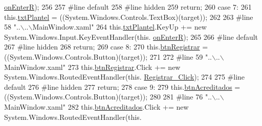 \begin{DoxyCode}
      \hyperlink{class_asistencias__wpf_1_1_main_window_a021f286d29f89afb7e646c8a02fdcb4b}{onEnterR});
256             
257 \textcolor{preprocessor}{            #line default}
258 \textcolor{preprocessor}{}\textcolor{preprocessor}{            #line hidden}
259 \textcolor{preprocessor}{}            \textcolor{keywordflow}{return};
260             \textcolor{keywordflow}{case} 7:
261             this.\hyperlink{class_asistencias__wpf_1_1_main_window_a20520a2029311127a68cc320e5a1aed4}{txtPlantel} = ((System.Windows.Controls.TextBox)(target));
262             
263 \textcolor{preprocessor}{            #line 58 "..\(\backslash\)..\(\backslash\)MainWindow.xaml"}
264 \textcolor{preprocessor}{}            this.\hyperlink{class_asistencias__wpf_1_1_main_window_a20520a2029311127a68cc320e5a1aed4}{txtPlantel}.KeyUp += \textcolor{keyword}{new} System.Windows.Input.KeyEventHandler(this.
      \hyperlink{class_asistencias__wpf_1_1_main_window_a021f286d29f89afb7e646c8a02fdcb4b}{onEnterR});
265             
266 \textcolor{preprocessor}{            #line default}
267 \textcolor{preprocessor}{}\textcolor{preprocessor}{            #line hidden}
268 \textcolor{preprocessor}{}            \textcolor{keywordflow}{return};
269             \textcolor{keywordflow}{case} 8:
270             this.\hyperlink{class_asistencias__wpf_1_1_main_window_a37ce519d4dc242993a180c9ec48581f6}{btnRegistrar} = ((System.Windows.Controls.Button)(target));
271             
272 \textcolor{preprocessor}{            #line 59 "..\(\backslash\)..\(\backslash\)MainWindow.xaml"}
273 \textcolor{preprocessor}{}            this.\hyperlink{class_asistencias__wpf_1_1_main_window_a37ce519d4dc242993a180c9ec48581f6}{btnRegistrar}.Click += \textcolor{keyword}{new} System.Windows.RoutedEventHandler(this.
      \hyperlink{class_asistencias__wpf_1_1_main_window_ae4a25f0239f778a1a8ace8d4535c42e5}{Registrar\_Click});
274             
275 \textcolor{preprocessor}{            #line default}
276 \textcolor{preprocessor}{}\textcolor{preprocessor}{            #line hidden}
277 \textcolor{preprocessor}{}            \textcolor{keywordflow}{return};
278             \textcolor{keywordflow}{case} 9:
279             this.\hyperlink{class_asistencias__wpf_1_1_main_window_a926b718586c2787f19ddaa4001911d1b}{btnAcreditados} = ((System.Windows.Controls.Button)(target));
280             
281 \textcolor{preprocessor}{            #line 76 "..\(\backslash\)..\(\backslash\)MainWindow.xaml"}
282 \textcolor{preprocessor}{}            this.\hyperlink{class_asistencias__wpf_1_1_main_window_a926b718586c2787f19ddaa4001911d1b}{btnAcreditados}.Click += \textcolor{keyword}{new} System.Windows.RoutedEventHandler(this.

\end{DoxyCode}
